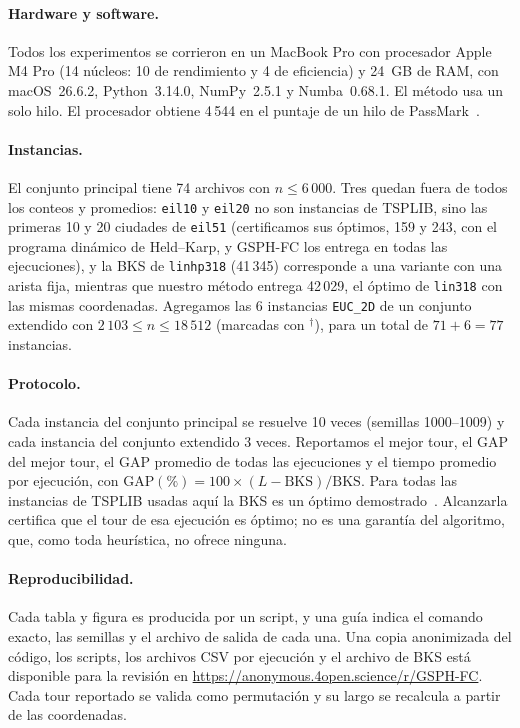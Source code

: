 \documentclass[runningheads]{llncs}
\begin{document}
\paragraph{Hardware y software.}
Todos los experimentos se corrieron en un MacBook Pro con procesador
Apple M4 Pro (14 núcleos: 10 de rendimiento y 4 de eficiencia) y 24~GB
de RAM, con macOS~26.6.2, Python~3.14.0, NumPy~2.5.1 y Numba~0.68.1. El
método usa un solo hilo. El procesador obtiene 4\,544 en el puntaje de
un hilo de PassMark~\cite{passmark_m4pro}.

\paragraph{Instancias.} El conjunto principal tiene 74 archivos con
$n\le 6\,000$. Tres quedan fuera de todos los conteos y promedios:
\texttt{eil10} y \texttt{eil20} no son instancias de TSPLIB, sino las
primeras 10 y 20 ciudades de \texttt{eil51} (certificamos sus óptimos,
159 y 243, con el programa dinámico de Held--Karp, y GSPH-FC los entrega
en todas las ejecuciones), y la BKS de \texttt{linhp318} (41\,345)
corresponde a una variante con una arista fija, mientras que nuestro
método entrega 42\,029, el óptimo de \texttt{lin318} con las mismas
coordenadas. Agregamos las 6 instancias \texttt{EUC\_2D} de un conjunto
extendido con $2\,103\le n\le 18\,512$ (marcadas con $^{\dagger}$),
para un total de $71+6=77$ instancias.

\paragraph{Protocolo.} Cada instancia del conjunto principal se resuelve
10 veces (semillas 1000--1009) y cada instancia del conjunto extendido 3
veces. Reportamos el mejor tour, el GAP del mejor tour, el GAP promedio
de todas las ejecuciones y el tiempo promedio por ejecución, con
GAP$(\%)=100\times(L-\text{BKS})/\text{BKS}$. Para todas las instancias
de TSPLIB usadas aquí la BKS es un óptimo
demostrado~\cite{reinelt1991tsplib,applegate2006tsp}. Alcanzarla
certifica que el tour de esa ejecución es óptimo; no es una garantía del
algoritmo, que, como toda heurística, no ofrece ninguna.

\paragraph{Reproducibilidad.} Cada tabla y figura es producida por un
script, y una guía indica el comando exacto, las semillas y el archivo de
salida de cada una. Una copia anonimizada del código, los scripts, los
archivos CSV por ejecución y el archivo de BKS está disponible para la
revisión en \url{https://anonymous.4open.science/r/GSPH-FC}.
Cada tour reportado se valida como permutación y su largo se recalcula a
partir de las coordenadas.
\end{document}
